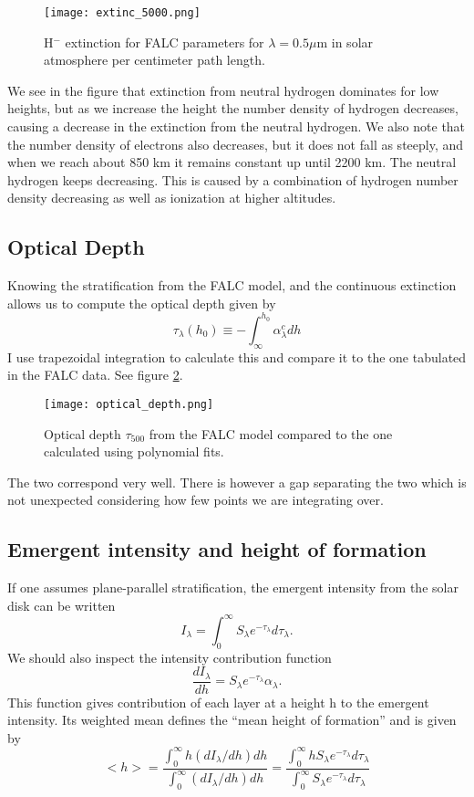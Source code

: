 \documentclass{aa}   %
\begin{document}
\begin{figure}
 \texttt{[image: extinc\_5000.png]}
 \caption{H$^-$ extinction for FALC parameters for $\lambda = 0.5\mu$m in solar atmosphere per centimeter path length.}
 \label{extinc_5000} 
\end{figure}
We see in the figure that extinction from neutral hydrogen dominates for low heights, but as we increase the height the number density of hydrogen decreases, causing a decrease in the extinction from the neutral hydrogen. We also note that the number density of electrons also decreases, but it does not fall as steeply, and when we reach about 850 km it remains constant up until 2200 km. The neutral hydrogen keeps decreasing. This is caused by a combination of hydrogen number density decreasing as well as ionization at higher altitudes. 

\subsection{Optical Depth}
Knowing the stratification from the FALC model, and the continuous extinction allows us to compute the optical depth given by 
\begin{equation}
 \tau_\lambda(h_0) \equiv - \int_\infty^{h_0}\alpha_\lambda^c dh
\end{equation}
I use trapezoidal integration to calculate this and compare it to the one tabulated in the FALC data. See figure \ref{optical_depth}.
\begin{figure}
 \texttt{[image: optical\_depth.png]}
 \caption{Optical depth $\tau_{500}$ from the FALC model compared to the one calculated using polynomial fits.}
 \label{optical_depth}
\end{figure}
The two correspond very well. There is however a gap separating the two which is not unexpected considering how few points we are integrating over.
\subsection{Emergent intensity and height of formation}
If one assumes plane-parallel stratification, the emergent intensity from the solar disk can be written
\begin{equation}
 I_\lambda = \int_0^\infty S_\lambda e^{-\tau_\lambda}d\tau_\lambda.
\end{equation}
We should also inspect the intensity contribution function
\begin{equation}
 \frac{dI_\lambda}{dh} = S_\lambda e^{-\tau_\lambda}\alpha_\lambda.
\end{equation}
This function gives contribution of each layer at a height h to the emergent intensity. Its weighted mean defines the ``mean height of formation'' and is given by
\begin{equation}
 <h> = \frac{\int_0^\infty h(dI_\lambda/dh)dh}{\int_0^\infty(dI_\lambda/dh)dh} = \frac{\int_0^\infty hS_\lambda e^{-\tau_\lambda}d\tau_\lambda}{\int_0^\infty S_\lambda e^{-\tau_\lambda}d\tau_\lambda}
\end{equation}
\end{document}

